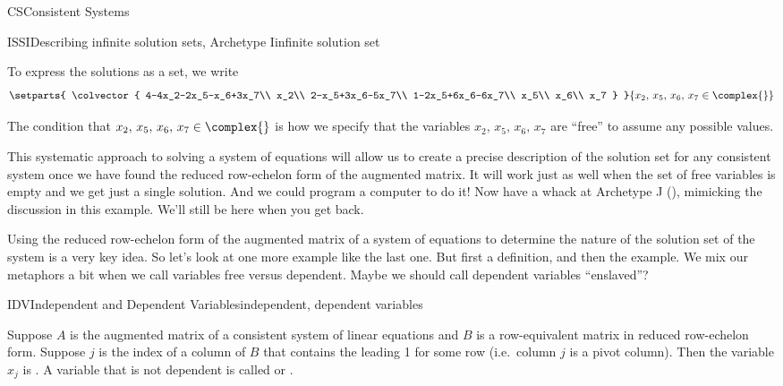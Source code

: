 \begin{subsect}{CS}{Consistent Systems}
\begin{example}{ISSI}{Describing infinite solution sets, Archetype I}{infinite solution set}
%
\begin{para}To express the solutions as a set, we write
\begin{equation*}
\setparts{
\colvector{
4-4x_2-2x_5-x_6+3x_7\\
x_2\\
2-x_5+3x_6-5x_7\\
1-2x_5+6x_6-6x_7\\
x_5\\
x_6\\
x_7
}
}{
x_2,\,x_5,\,x_6,\,x_7\in\complex{\null}
}
\end{equation*}
\end{para}
%
\begin{para}The condition that $x_2,\,x_5,\,x_6,\,x_7\in\complex{\null}$ is how we specify that the variables $x_2,\,x_5,\,x_6,\,x_7$ are ``free'' to assume any possible values.\end{para}
%
\begin{para}This systematic approach to solving a system of equations will allow us to create a precise description of the solution set for any consistent system once we have found the reduced row-echelon form of the augmented matrix.  It will work just as well when the set of free variables is empty and we get just a single solution.  And we could program a computer to do it!  Now have a whack at Archetype J (), mimicking the discussion in this example.  We'll still be here when you get back.\end{para}
\end{example}
%
\begin{para}Using the reduced row-echelon form of the augmented matrix of a system of equations to determine the nature of the solution set of the system is a very key idea.  So let's look at one more example like the last one.  But first a definition, and then the example.   We mix our metaphors a bit when we call variables free versus dependent.  Maybe we should call dependent variables ``enslaved''?\end{para}
%
\begin{definition}{IDV}{Independent and Dependent Variables}{independent, dependent variables}
\begin{para}Suppose $A$ is the augmented matrix of a consistent system of linear equations and $B$ is a row-equivalent matrix in reduced row-echelon form.  Suppose $j$ is the index of a column of $B$ that contains the leading 1 for some row (i.e.\ column $j$ is a pivot column).  Then the variable $x_j$ is .  A variable that is not dependent is called  or .\end{para}

\end{definition}
\end{subsect}
